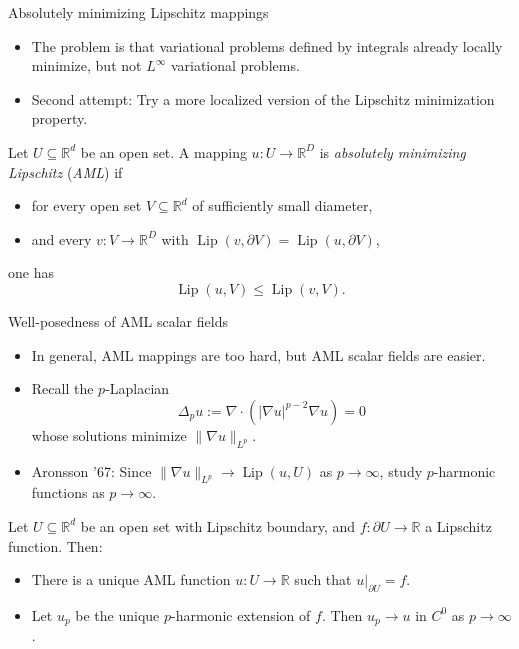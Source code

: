\documentclass[10pt]{beamer}
\newcommand{\RR}{\mathbb{R}}
\DeclareMathOperator{\Lip}{Lip}
\begin{document}
\begin{frame}{Absolutely minimizing Lipschitz mappings}
\begin{itemize}
\item The problem is that variational problems defined by integrals already locally minimize, but not $L^\infty$ variational problems. 
\item Second attempt: Try a more localized version of the Lipschitz minimization property. 
\end{itemize}

\begin{definition}
Let $U \subseteq \RR^d$ be an open set.
A mapping $u: U \to \RR^D$ is \emph{absolutely minimizing Lipschitz} (\emph{AML}) if 
\begin{itemize}
\item for every open set $V \subseteq \RR^d$ of sufficiently small diameter, 
\item and every $v: V \to \RR^D$ with $\Lip(v, \partial V) = \Lip(u, \partial V)$, 
\end{itemize}
one has
$$\Lip(u, V) \leq \Lip(v, V).$$
\end{definition}
\end{frame}

\begin{frame}{Well-posedness of AML scalar fields}
\begin{itemize}
\item In general, AML mappings are too hard, but AML scalar fields are easier. 
\item Recall the $p$-Laplacian 
$$\Delta_p u := \nabla \cdot (|\nabla u|^{p - 2} \nabla u) = 0$$
whose solutions minimize $\|\nabla u\|_{L^p}$. 
\item Aronsson '67: Since $\|\nabla u\|_{L^p} \to \Lip(u, U)$ as $p \to \infty$, study $p$-harmonic functions as $p \to \infty$. 
\end{itemize}

\begin{theorem}[Jensen '93]
Let $U \subseteq \RR^d$ be an open set with Lipschitz boundary, and $f: \partial U \to \RR$ a Lipschitz function. Then: 
\begin{itemize}
\item There is a unique AML function $u: U \to \RR$ such that $u|_{\partial U} = f$. 
\item Let $u_p$ be the unique $p$-harmonic extension of $f$.
Then $u_p \to u$ in $C^0$ as $p \to \infty$.
\end{itemize}
\end{theorem}
\end{frame}
\end{document}
